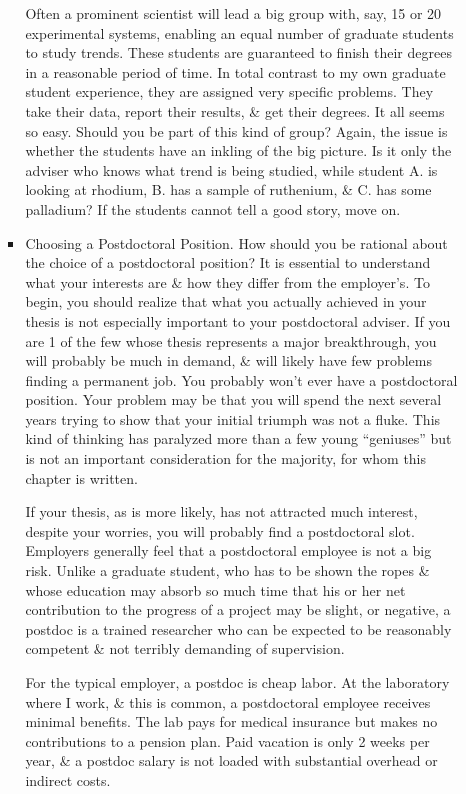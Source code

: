 \documentclass{article}
\begin{document}
\begin{enumerate}
\begin{itemize}
\begin{itemize}
			Often a prominent scientist will lead a big group with, say, 15 or 20 experimental systems, enabling an equal number of graduate students to study trends. These students are guaranteed to finish their degrees in a reasonable period of time. In total contrast to my own graduate student experience, they are assigned very specific problems. They take their data, report their results, \& get their degrees. It all seems so easy. Should you be part of this kind of group? Again, the issue is whether the students have an inkling of the big picture. Is it only the adviser who knows what trend is being studied, while student A. is looking at rhodium, B. has a sample of ruthenium, \& C. has some palladium? If the students cannot tell a good story, move on.
			\item {\sf Choosing a Postdoctoral Position.} How should you be rational about the choice of a postdoctoral position? It is essential to understand what your interests are \& how they differ from the employer's. To begin, you should realize that what you actually achieved in your thesis is not especially important to your postdoctoral adviser. If you are 1 of the few whose thesis represents a major breakthrough, you will probably be much in demand, \& will likely have few problems finding a permanent job. You probably won't ever have a postdoctoral position. Your problem may be that you will spend the next several years trying to show that your initial triumph was not a fluke. This kind of thinking has paralyzed more than a few young ``geniuses'' but is not an important consideration for the majority, for whom this chapter is written.
			
			If your thesis, as is more likely, has not attracted much interest, despite your worries, you will probably find a postdoctoral slot. Employers generally feel that a postdoctoral employee is not a big risk. Unlike a graduate student, who has to be shown the ropes \& whose education may absorb so much time that his or her net contribution to the progress of a project may be slight, or negative, a postdoc is a trained researcher who can be expected to be reasonably competent \& not terribly demanding of supervision.
			
			For the typical employer, a postdoc is cheap labor. At the laboratory where I work, \& this is common, a postdoctoral employee receives minimal benefits. The lab pays for medical insurance but makes no contributions to a pension plan. Paid vacation is only 2 weeks per year, \& a postdoc salary is not loaded with substantial overhead or indirect costs.
			

\end{itemize}
\end{itemize}
\end{enumerate}
\end{document}
